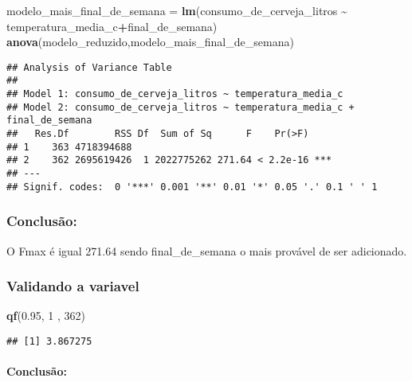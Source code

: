 \documentclass[
]{article}
\newenvironment{Shaded}{\begin{snugshade}}{\end{snugshade}}
\newcommand{\DecValTok}[1]{\textcolor[rgb]{0.00,0.00,0.81}{#1}}
\newcommand{\FloatTok}[1]{\textcolor[rgb]{0.00,0.00,0.81}{#1}}
\newcommand{\FunctionTok}[1]{\textcolor[rgb]{0.13,0.29,0.53}{\textbf{#1}}}
\newcommand{\NormalTok}[1]{#1}
\newcommand{\OtherTok}[1]{\textcolor[rgb]{0.56,0.35,0.01}{#1}}
\newcommand{\SpecialCharTok}[1]{\textcolor[rgb]{0.81,0.36,0.00}{\textbf{#1}}}
\begin{document}
\begin{Shaded}
\begin{Highlighting}[]
\NormalTok{modelo\_mais\_final\_de\_semana }\OtherTok{=} \FunctionTok{lm}\NormalTok{(consumo\_de\_cerveja\_litros }\SpecialCharTok{\textasciitilde{}}\NormalTok{ temperatura\_media\_c}\SpecialCharTok{+}\NormalTok{final\_de\_semana)}
\FunctionTok{anova}\NormalTok{(modelo\_reduzido,modelo\_mais\_final\_de\_semana)}
\end{Highlighting}
\end{Shaded}

\begin{verbatim}
## Analysis of Variance Table
## 
## Model 1: consumo_de_cerveja_litros ~ temperatura_media_c
## Model 2: consumo_de_cerveja_litros ~ temperatura_media_c + final_de_semana
##   Res.Df        RSS Df  Sum of Sq      F    Pr(>F)    
## 1    363 4718394688                                   
## 2    362 2695619426  1 2022775262 271.64 < 2.2e-16 ***
## ---
## Signif. codes:  0 '***' 0.001 '**' 0.01 '*' 0.05 '.' 0.1 ' ' 1
\end{verbatim}

\hypertarget{conclusuxe3o-3}{%
\subsubsection{Conclusão:}\label{conclusuxe3o-3}}

O Fmax é igual 271.64 sendo final\_de\_semana o mais provável de ser
adicionado.

\hypertarget{validando-a-variavel}{%
\subsubsection{Validando a variavel}\label{validando-a-variavel}}

\begin{Shaded}
\begin{Highlighting}[]
\FunctionTok{qf}\NormalTok{(}\FloatTok{0.95}\NormalTok{, }\DecValTok{1}\NormalTok{ , }\DecValTok{362}\NormalTok{)}
\end{Highlighting}
\end{Shaded}

\begin{verbatim}
## [1] 3.867275
\end{verbatim}

\hypertarget{conclusuxe3o-4}{%
\paragraph{Conclusão:}\label{conclusuxe3o-4}}
\end{document}

